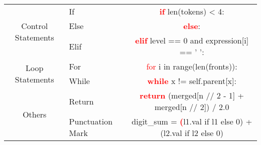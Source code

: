 \begin{table*}[htbp]
\begin{minipage}{\textwidth}
\begin{tabular}{cl|c}
         \multirow{3}{*}{Control Statements} & \hspace{3.5em} If & \textcolor{red}{\textbf{if}} len(tokens) < 4:\\
         &\hspace{3.3em}Else & \textcolor{red}{\textbf{else}}:\\
         & \hspace{3.3em}Elif & \textcolor{red}{\textbf{elif}} level == 0 and expression[i] == ' ':\\
        \multirow{2}{*}{Loop Statements} & \hspace{3.1em} For & \textcolor{red}{for} i in range(len(fronts)):\\
         & \hspace{2.7em} While & \textcolor{red}{\textbf{while}} x != self.parent[x]:\\
         \multirow{2}{*}{Others} & \vline\hspace{2.2em} Return & \textcolor{red}{\textbf{return}} (merged[n // 2 - 1] + merged[n // 2]) / 2.0\\
        & \vline \hspace{0.2em} Punctuation Mark  & digit\_sum = \textcolor{red}{\textbf{(}}l1.val if l1 else 0) + (l2.val if l2 else 0)\\
         
         \bottomrule
   \end{tabular}
   
  \label{tab:Code_confused_samples}
    \end{minipage}
\end{table*}




